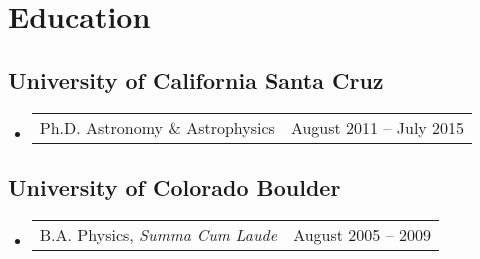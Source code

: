 \documentclass[10pt,letterpaper]{article}
\newcommand{\textline}[2]{
  \begin{tabularx}{\textwidth}{XY}
  #1 & #2
  \end{tabularx}
}
\begin{document}
\section*{Education}

\subsection*{University of California Santa Cruz}
\begin{itemize}
\item[] \textline{Ph.D. Astronomy \& Astrophysics}{August 2011 -- July 2015}  %
\end{itemize}

\subsection*{University of Colorado Boulder}
\begin{itemize}
  \item[] \textline{B.A. Physics, \textit{Summa Cum Laude}}{August 2005 -- 2009}  %
\end{itemize}
\end{document}
